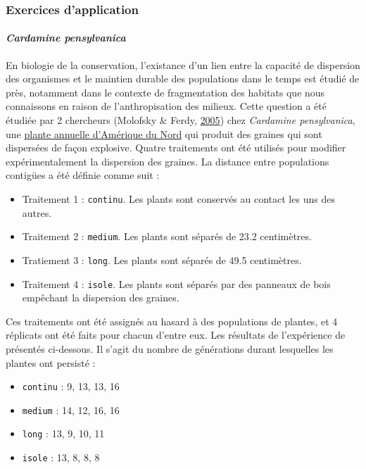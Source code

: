 \documentclass[a4paperpaper,]{article}
\providecommand{\tightlist}{%
  \setlength{\itemsep}{0pt}\setlength{\parskip}{0pt}}
\let\oldparagraph\paragraph
\renewcommand{\paragraph}[1]{\oldparagraph{#1}\mbox{}}
\begin{document}
\hypertarget{exercices-dapplication}{%
\subsubsection{Exercices d'application}\label{exercices-dapplication}}

\hypertarget{cardamine-pensylvanica}{%
\paragraph{\texorpdfstring{\emph{Cardamine pensylvanica}}{Cardamine pensylvanica}}\label{cardamine-pensylvanica}}

En biologie de la conservation, l'existance d'un lien entre la capacité de dispersion des organismes et le maintien durable des populations dans le temps est étudié de près, notamment dans le contexte de fragmentation des habitats que nous connaissons en raison de l'anthropisation des milieux.
Cette question a été étudiée par 2 chercheurs (Molofsky \& Ferdy, \protect\hyperlink{ref-Molofsky2005}{2005}) chez \emph{Cardamine pensylvanica}, une \href{https://en.wikipedia.org/wiki/Cardamine_pensylvanica}{plante annuelle d'Amérique du Nord} qui produit des graines qui sont dispersées de façon explosive. Quatre traitements ont été utilisés pour modifier expérimentalement la dispersion des graines. La distance entre populations contigües a été définie comme suit :

\begin{itemize}
\tightlist
\item
  Traitement 1 : \texttt{continu}. Les plants sont conservés au contact les uns des autres.
\item
  Traitement 2 : \texttt{medium}. Les plants sont séparés de 23.2 centimètres.
\item
  Tratiement 3 : \texttt{long}. Les plants sont séparés de 49.5 centimètres.
\item
  Traitement 4 : \texttt{isole}. Les plants sont séparés par des panneaux de bois empêchant la dispersion des graines.
\end{itemize}

Ces traitements ont été assignés au hasard à des populations de plantes, et 4 réplicats ont été faits pour chacun d'entre eux. Les résultats de l'expérience de présentés ci-dessous. Il s'agit du nombre de générations durant lesquelles les plantes ont persisté :

\begin{itemize}
\tightlist
\item
  \texttt{continu} : 9, 13, 13, 16
\item
  \texttt{medium} : 14, 12, 16, 16
\item
  \texttt{long} : 13, 9, 10, 11
\item
  \texttt{isole} : 13, 8, 8, 8
\end{itemize}
\end{document}
